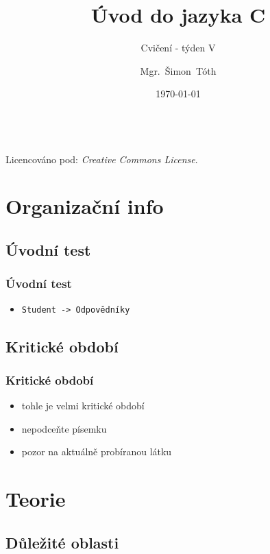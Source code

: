 

\title{Úvod do jazyka C}
\subtitle{Cvičení - týden V}
\author[]{Mgr.~Šimon~Tóth}
\date{\today}

\newcommand{\CcNote}[1]{%
        Licencováno pod: \textit{Creative Commons #1 3.0 License}.%
}


	\begin{frame}
		\titlepage
		\vfill
		\begin{center}
			\\
			{\tiny\CcNote{\CcLongnameByNcSa}}
			\vspace*{2ex}
		\end{center}
	\end{frame}

\section{Organizační info}
\subsection{Úvodní test}

\begin{frame}
	\frametitle{Úvodní test}
	\begin{itemize}
		\item{\texttt{Student -> Odpovědníky}}
	\end{itemize}
\end{frame}

\subsection{Kritické období}

\begin{frame}
	\frametitle{Kritické období}
	\begin{itemize}
		\item{tohle je velmi kritické období}
		\item{nepodceňte písemku}
		\item{pozor na aktuálně probíranou látku}
	\end{itemize}
\end{frame}

\section{Teorie}
\subsection{Důležité oblasti}

